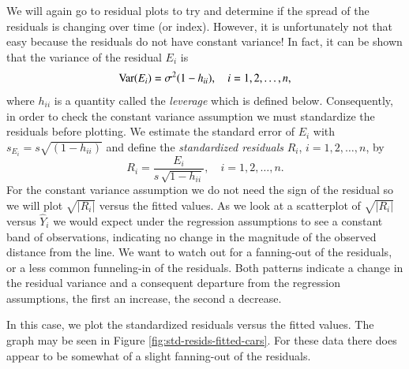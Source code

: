 \documentclass[captions=tableheading]{scrbook}
\begin{document}
\label{sub:Constant-Variance-Assumption}

We will again go to residual plots to try and determine if the spread of the residuals is changing over time (or index). However, it is unfortunately not that easy because the residuals do not have constant variance! In fact, it can be shown that the variance of the residual \(E_{i}\) is 
\begin{equation}
\mbox{Var\ensuremath{(E_{i})}}=\sigma^{2}(1-h_{ii}),\quad i=1,2,\ldots,n,
\end{equation}
where \(h_{ii}\) is a quantity called the \emph{leverage} which is defined below. Consequently, in order to check the constant variance assumption we must standardize the residuals before plotting. We estimate the standard error of \(E_{i}\) with \(s_{E_{i}}=s\sqrt{(1-h_{ii})}\) and define the \emph{standardized residuals} \(R_{i}\), \(i=1,2,\ldots,n\), by 
\begin{equation} 
R_{i}=\frac{E_{i}}{s\,\sqrt{1-h_{ii}}},\quad i=1,2,\ldots,n.
\end{equation}
For the constant variance assumption we do not need the sign of the residual so we will plot \(\sqrt{|R_{i}|}\) versus the fitted values. As we look at a scatterplot of \(\sqrt{|R_{i}|}\) versus \(\hat{Y}_{i}\) we would expect under the regression assumptions to see a constant band of observations, indicating no change in the magnitude of the observed distance from the line. We want to watch out for a fanning-out of the residuals, or a less common funneling-in of the residuals. Both patterns indicate a change in the residual variance and a consequent departure from the regression assumptions, the first an increase, the second a decrease.

In this case, we plot the standardized residuals versus the fitted values. The graph may be seen in Figure \ref{fig:std-resids-fitted-cars}. For these data there does appear to be somewhat of a slight fanning-out of the residuals.
\end{document}
